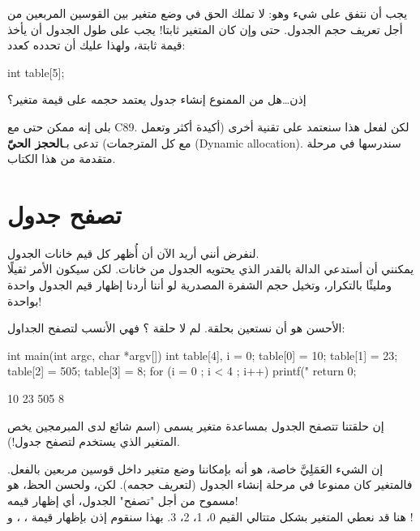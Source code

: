 يجب أن نتفق على شيء وهو: لا تملك الحق في وضع متغير بين القوسين المربعين من أجل تعريف حجم الجدول. حتى وإن كان المتغير ثابتا! يجب على طول الجدول أن يأخذ قيمة ثابتة، ولهذا عليك أن تحدده كعدد:
\begin{Csource}
int table[5];
\end{Csource}

\begin{question}
   إذن\dots هل من الممنوع إنشاء جدول يعتمد حجمه على قيمة متغير؟
\end{question}

بلى إنه ممكن حتى مع
\textenglish{C89}.
لكن لفعل هذا سنعتمد على تقنية أخرى (أكيدة أكثر وتعمل مع كل المترجمات) تدعى بـ\textbf{الحجز الحيّ}
(\textenglish{Dynamic allocation}).
سندرسها في مرحلة متقدمة من هذا الكتاب.

\section{تصفح جدول}

لنفرض أنني أريد الآن أن أُظهر كل قيم خانات الجدول.\\
يمكنني أن أستدعي الدالة
بالقدر الذي يحتويه الجدول من خانات. لكن سيكون الأمر ثقيلًا ومليئًا بالتكرار، وتخيل حجم الشفرة المصدرية لو أننا أردنا إظهار قيم الجدول واحدة بواحدة!

الأحسن هو أن نستعين بحلقة. لم لا حلقة
؟ فهي الأنسب لتصفح الجداول:

\begin{Csource}
int main(int argc, char *argv[])
{
	int table[4], i = 0;
	table[0] = 10;
	table[1] = 23;
	table[2] = 505;
	table[3] = 8;
	for (i = 0 ; i < 4 ; i++)
	{
    		printf("%
	}
	return 0;
}
\end{Csource}

\begin{Console}
10
23
505
8
\end{Console}

إن حلقتنا تتصفح الجدول بمساعدة متغير يسمى
(اسم شائع لدى المبرمجين يخص المتغير الذي يستخدم لتصفح جدول!).

إن الشيء العَمَلِيَّ خاصة، هو أنه بإمكاننا وضع متغير داخل قوسين مربعين بالفعل. فالمتغير كان ممنوعا في مرحلة إنشاء الجدول (لتعريف حجمه). لكن، ولحسن الحظ، هو مسموح من أجل "تصفح" الجدول، أي إظهار قيمه!\\
هنا قد نعطي المتغير
بشكل متتالي القيم 0، 1، 2، 3. بهذا سنقوم إذن بإظهار قيمة
،
،
و
!

